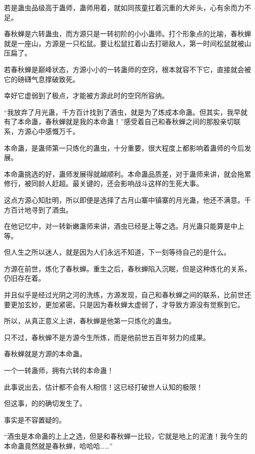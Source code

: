 \begin{this_body}
若是蛊虫品级高于蛊师，蛊师用着，就如同孩童扛着沉重的大斧头，心有余而力不足。

春秋蝉是六转蛊虫，而方源只是一转初阶的小小蛊师。打个形象点的比喻，春秋蝉就是一座山，方源是一只松鼠。要让松鼠扛着山去打砸敌人，第一时间松鼠就被山压扁了。

若春秋蝉是巅峰状态，方源小小的一转蛊师的空窍，根本就容不下它，直接就会被它的磅礴气息撑破致死。

幸好它虚弱到了极点，才能被方源此时的空窍所容纳。

“我放弃了月光蛊，千方百计找到了酒虫，就是为了炼成本命蛊。但其实，我早就有了本命蛊，春秋蝉就是我的本命蛊！”感受着自己和春秋蝉之间的那股亲切联系，方源心中感慨万千。

本命蛊，是蛊师第一只炼化的蛊虫，十分重要，很大程度上都影响着蛊师的今后发展。

本命蛊挑选的好，蛊师发展得就越顺利。本命蛊品质差，对于蛊师来讲，就会拖累修行，被同龄人赶超。最关键的，还会影响战斗这样的生死大事。

这点方源心知肚明，所以即便是选择了古月山寨中镇寨的月光蛊，他还不满意。千方百计地寻到了酒虫。

在他记忆中，对一转新嫩蛊师来讲，酒虫已经是上等之选。月光蛊只能算是中上等。

但人生之所以迷人，就是因为人们永远不知道，下一刻等待自己的是什么。

方源在前世，炼化了春秋蝉。重生之后，春秋蝉陷入沉眠，但是这种炼化的关系，仍旧存在着。

并且似乎是经过光阴之河的洗练，方源发现，自己和春秋蝉之间的联系，比前世还要更加玄妙，更加紧密。只是因为春秋蝉太虚弱了，才导致方源没有觉察到它。

所以，从真正意义上讲，春秋蝉是他第一只炼化的蛊虫。

只不过，春秋蝉不是方源今生所炼，而是他前世五百年努力的成果。

春秋蝉就是方源的本命蛊。

一个一转蛊师，拥有六转的本命蛊！

此事说出去，估计都不会有人相信！这已经打破世人认知的极限！

但这事，的的确切发生了。

事实是不容置疑的。

“酒虫是本命蛊的上上之选，但是和春秋蝉一比较，它就是地上的泥渣！我今生的本命蛊竟然就是春秋蝉，哈哈哈……”

\end{this_body}

